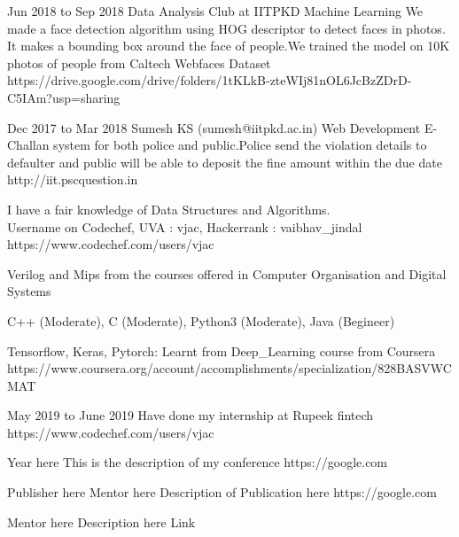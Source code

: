 {Jun 2018 to Sep 2018}
{Data Analysis Club at IITPKD}
{Machine Learning}
{We made a face detection algorithm using HOG descriptor to detect faces in photos. It makes a bounding box around the face of people.We trained the model on 10K photos of people from Caltech Webfaces Dataset}
{https://drive.google.com/drive/folders/1tKLkB-zteWIj81nOL6JcBzZDrD-C5IAm?usp=sharing}

{Dec 2017 to Mar 2018}
{Sumesh KS (sumesh@iitpkd.ac.in)}
{Web Development}
{E-Challan system for both police and public.Police send the violation details to defaulter and public will be able to deposit the fine amount within the due date}
{http://iit.pscquestion.in}


{I have a fair knowledge of Data Structures and Algorithms. \\Username on Codechef, UVA : vjac, Hackerrank : vaibhav\_jindal}
{https://www.codechef.com/users/vjac} 

{Verilog and Mips from the courses offered in Computer Organisation and Digital Systems}
{}                                                      %

{C++ (Moderate), C (Moderate), Python3 (Moderate), Java (Begineer)}
{}                                                      %

{Tensorflow, Keras, Pytorch: Learnt from Deep\_Learning course from Coursera}
{https://www.coursera.org/account/accomplishments/specialization/828BASVWCMAT}

{May 2019 to June 2019}
{Have done my internship at Rupeek fintech}
{https://www.codechef.com/users/vjac} 

{Year here}
{This is the description of my conference}
{https://google.com}


{Publisher here}
{Mentor here}
{Description of Publication here}
{https://google.com}

{Mentor here}
{Description here}
{Link}

